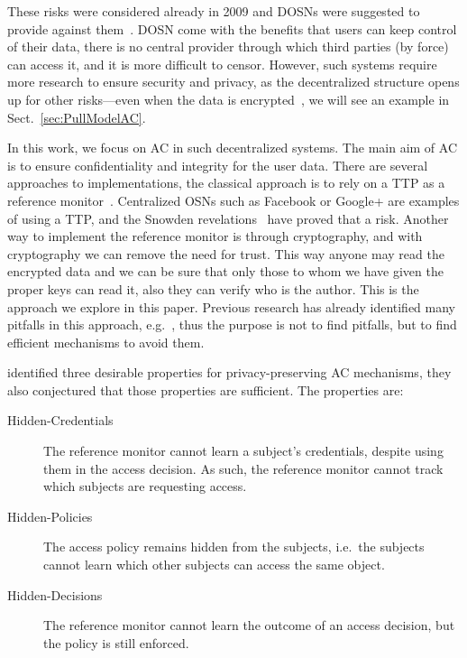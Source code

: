 These risks were considered already in 2009 and \acp{DOSN} were suggested to 
provide against them~\cite[e.g.][]{Peerson}.
\ac{DOSN} come with the benefits that users can keep control of their data, 
there is no central provider through which third parties (by force) can access 
it, and it is more difficult to censor.
However, such systems require more research to ensure security and privacy, as 
the decentralized structure opens up for other risks---even when the data is 
encrypted~\cite{DevilInMetadata}, we will see an example in 
Sect.~\ref{sec:PullModelAC}.

In this work, we focus on \ac{AC} in such decentralized systems.
The main aim of \ac{AC} is to ensure confidentiality and integrity for the user 
data.
There are several approaches to implementations, the classical approach is to 
rely on a \ac{TTP} as a reference monitor~\cite{AccessControl}.
Centralized \acp{OSN} such as Facebook or Google+ are examples of using 
a \ac{TTP}, and the Snowden revelations~\cite{prism} have proved that a risk.
Another way to implement the reference monitor is through cryptography, and 
with cryptography we can remove the need for trust.
This way anyone may read the encrypted data and we can be sure that only those 
to whom we have given the proper keys can read it, also they can verify who is 
the author.
This is the approach we explore in this paper.
Previous research has already identified many pitfalls in this approach, 
e.g.~\cite{DevilInMetadata}, thus the purpose is not to find pitfalls, but to 
find efficient mechanisms to avoid them.

\citet{TowardsPPACwHPHCHD} identified three desirable properties for 
privacy-preserving \ac{AC} mechanisms, they also conjectured that those 
properties are sufficient.
The properties are:
\begin{description}
  \item[Hidden-Credentials] The reference monitor cannot learn a subject's 
    credentials, despite using them in the access decision.
    As such, the reference monitor cannot track which subjects are requesting 
    access.
  \item[Hidden-Policies] The access policy remains hidden from the subjects, 
    i.e.\ the subjects cannot learn which other subjects can access the same 
    object.
  \item[Hidden-Decisions] The reference monitor cannot learn the outcome of an 
    access decision, but the policy is still enforced.
\end{description}

